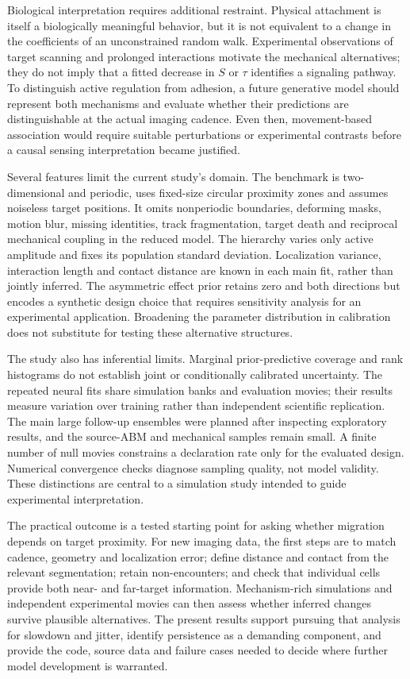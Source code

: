 \documentclass[12pt]{article}
\begin{document}
Biological interpretation requires additional restraint. Physical attachment is itself a biologically meaningful behavior, but it is not equivalent to a change in the coefficients of an unconstrained random walk. Experimental observations of target scanning and prolonged interactions motivate the mechanical alternatives\citep{olofsson2014}; they do not imply that a fitted decrease in $S$ or $\tau$ identifies a signaling pathway. To distinguish active regulation from adhesion, a future generative model should represent both mechanisms and evaluate whether their predictions are distinguishable at the actual imaging cadence. Even then, movement-based association would require suitable perturbations or experimental contrasts before a causal sensing interpretation became justified.

Several features limit the current study's domain. The benchmark is two-dimensional and periodic, uses fixed-size circular proximity zones and assumes noiseless target positions. It omits nonperiodic boundaries, deforming masks, motion blur, missing identities, track fragmentation, target death and reciprocal mechanical coupling in the reduced model. The hierarchy varies only active amplitude and fixes its population standard deviation. Localization variance, interaction length and contact distance are known in each main fit, rather than jointly inferred. The asymmetric effect prior retains zero and both directions but encodes a synthetic design choice that requires sensitivity analysis for an experimental application. Broadening the parameter distribution in calibration does not substitute for testing these alternative structures.

The study also has inferential limits. Marginal prior-predictive coverage and rank histograms do not establish joint or conditionally calibrated uncertainty\citep{talts2018,sailynoja2022}. The repeated neural fits share simulation banks and evaluation movies; their results measure variation over training rather than independent scientific replication. The main large follow-up ensembles were planned after inspecting exploratory results, and the source-ABM and mechanical samples remain small. A finite number of null movies constrains a declaration rate only for the evaluated design. Numerical convergence checks diagnose sampling quality, not model validity. These distinctions are central to a simulation study intended to guide experimental interpretation\citep{morris2019}.

The practical outcome is a tested starting point for asking whether migration depends on target proximity. For new imaging data, the first steps are to match cadence, geometry and localization error; define distance and contact from the relevant segmentation; retain non-encounters; and check that individual cells provide both near- and far-target information. Mechanism-rich simulations and independent experimental movies can then assess whether inferred changes survive plausible alternatives. The present results support pursuing that analysis for slowdown and jitter, identify persistence as a demanding component, and provide the code, source data and failure cases needed to decide where further model development is warranted.
\end{document}
